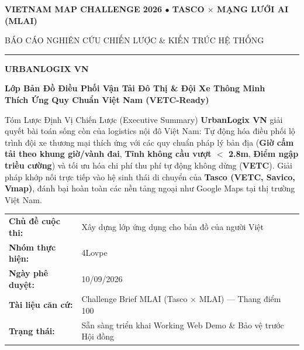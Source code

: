 \documentclass[11pt,a4paper]{article}
\begin{document}
\begin{titlepage}
  \centering
  \vspace*{0.6cm}
  
  \begin{tcolorbox}[colback=primary, colframe=primary, arc=2mm, width=\textwidth, halign=center]
    {\bfseries\color{white}\small VIETNAM MAP CHALLENGE 2026 $\bullet$ TASCO $\times$ MẠNG LƯỚI AI (MLAI)\par}
  \end{tcolorbox}
  
  \vspace{0.8cm}
  {\scshape\Large BÁO CÁO NGHIÊN CỨU CHIẾN LƯỢC \& KIẾN TRÚC HỆ THỐNG \par}
  \vspace{0.3cm}
  {\color{secondary}\rule{0.6\textwidth}{1.2pt}\par}
  \vspace{0.8cm}
  
  {\Huge\bfseries\color{primary} URBANLOGIX VN \par}
  \vspace{0.5cm}
  {\Large\bfseries\color{secondary} Lớp Bản Đồ Điều Phối Vận Tải Đô Thị \& Đội Xe Thông Minh\\ Thích Ứng Quy Chuẩn Việt Nam (VETC-Ready) \par}
  \vspace{1.2cm}
  
  \begin{calloutbox}[secondary]{Tóm Lược Định Vị Chiến Lược (Executive Summary)}
    \textbf{UrbanLogix VN} giải quyết bài toán sống còn của logistics nội đô Việt Nam: Tự động hóa điều phối lộ trình đội xe thương mại thích ứng với các quy chuẩn pháp lý bản địa (\textbf{Giờ cấm tải theo khung giờ/vành đai}, \textbf{Tĩnh không cầu vượt $<$ 2.8m}, \textbf{Điểm ngập triều cường}) và tối ưu hóa chi phí thu phí tự động không dừng (\textbf{VETC}). Giải pháp khớp nối trực tiếp vào hệ sinh thái di chuyển của \textbf{Tasco (VETC, Savico, Vmap)}, đánh bại hoàn toàn các nền tảng ngoại như Google Maps tại thị trường Việt Nam.
  \end{calloutbox}
  
  \vfill
  
  \begin{tcolorbox}[colback=lightbg, colframe=cardborder, arc=2.5mm, width=\textwidth]
    \begin{tabularx}{\textwidth}{lY}
      \textbf{Chủ đề cuộc thi:} & Xây dựng lớp ứng dụng cho bản đồ của người Việt \\
      \textbf{Nhóm thực hiện:}  & 4Lovpe \\
      \textbf{Ngày phê duyệt:}  & 10/09/2026 \\
      \textbf{Tài liệu căn cứ:} & Challenge Brief MLAI (Tasco $\times$ MLAI) — Thang điểm 100 \\
      \textbf{Trạng thái:}      & Sẵn sàng triển khai Working Web Demo \& Bảo vệ trước Hội đồng \\
    \end{tabularx}
  \end{tcolorbox}
  \vspace{0.5cm}
\end{titlepage}
\end{document}
